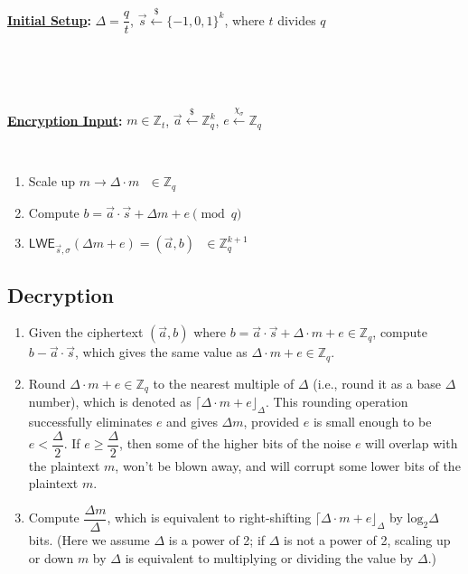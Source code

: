 \begin{tcolorbox}[title={\textbf{\tboxlabel{\ref*{subsec:lwe-enc}} LWE Encryption}}]
\textbf{\underline{Initial Setup}:} $\Delta = \dfrac{q}{t}$, $\vec{s} \xleftarrow{\$} \{-1, 0, 1\}^k$, where $t$ divides $q$

$ $

$ $

\textbf{\underline{Encryption Input}:} $m \in \mathbb{Z}_t$, $\vec{a} \xleftarrow{\$} \mathbb{Z}_q^k$, $e \xleftarrow{\chi_\sigma} \mathbb{Z}_q$

$ $


\begin{enumerate}
\item Scale up $m \longrightarrow \Delta \cdot m \text{ } \in \mathbb{Z}_q$

\item Compute $b = \vec{a} \cdot \vec{s} + \Delta  m + e \pmod q$
\item $\textsf{LWE}_{\vec{s},\sigma}(\Delta  m + e) = (\vec{a}, b) \text{ } \in \mathbb{Z}_q^{k + 1}$ 
\end{enumerate}

\end{tcolorbox}

\subsection{Decryption}
\label{subsec:lwe-dec} 

\begin{enumerate}
\item Given the ciphertext $(\vec{a}, b)$ where $b = \vec{a} \cdot \vec{s} + \Delta \cdot m + e \in \mathbb{Z}_q$, compute $b - \vec{a} \cdot \vec{s}$, which gives the same value as $\Delta \cdot m + e \in \mathbb{Z}_q$. 
\item Round $\Delta \cdot m + e \in \mathbb{Z}_q$ to the nearest multiple of $\Delta$ (i.e., round it as a base $\Delta$ number), which is denoted as $\lceil \Delta \cdot m + e \rfloor_{\Delta}$. This rounding operation successfully eliminates $e$ and gives $\Delta m$, provided $e$ is small enough to be $e < \dfrac{\Delta}{2}$. If $e \geq \dfrac{\Delta}{2}$, then some of the higher bits of the noise $e$ will overlap with the plaintext $m$, won't be blown away, and will corrupt some lower bits of the plaintext $m$.
\item Compute $\dfrac{\Delta m} {\Delta}$, which is equivalent to right-shifting $\lceil \Delta \cdot m + e \rfloor_{\Delta}$ by $\text{log}_2 \Delta$ bits. (Here we assume $\Delta$ is a power of 2; if $\Delta$ is not a power of 2, scaling up or down $m$ by $\Delta$ is equivalent to multiplying or dividing the value by $\Delta$.) 
\end{enumerate}

